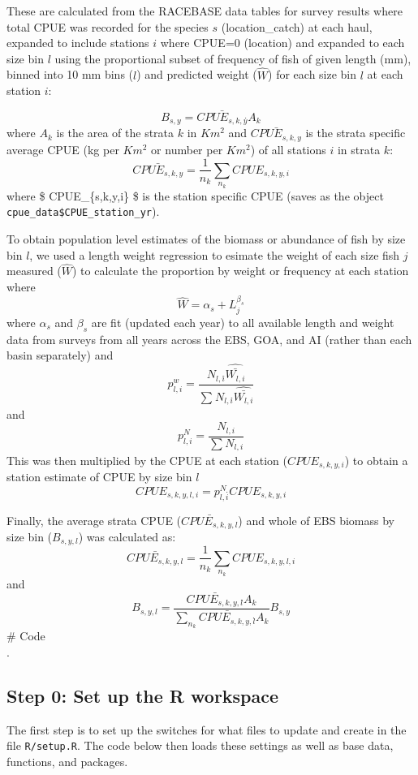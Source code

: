 \documentclass[
]{article}
\begin{document}
These are calculated from the RACEBASE data tables for survey results
where total CPUE was recorded for the species \(s\) (location\_catch) at
each haul, expanded to include stations \(i\) where CPUE=0 (location)
and expanded to each size bin \(l\) using the proportional subset of
frequency of fish of given length (mm), binned into 10 mm bins (\(l\))
and predicted weight (\(\hat{W}\)) for each size bin \(l\) at each
station \(i\):

\[B_{s,y} =  \bar{CPUE_{s,k,y}} \dot{}A_{k}\] where \(A_{k}\) is the
area of the strata \(k\) in \(Km^2\) and \(\bar{CPUE_{s,k,y}}\) is the
strata specific average CPUE (kg per \(Km^2\) or number per \(Km^2\)) of
all stations \(i\) in strata \(k\):
\[\bar{CPUE_{s,k,y}} = \frac{1}{n_k}\dot{}\sum_{n_k}{CPUE_{s,k,y,i}}\]
where \$ CPUE\_\{s,k,y,i\} \$ is the station specific CPUE (saves as the
object \texttt{cpue\_data\$CPUE\_station\_yr}).

To obtain population level estimates of the biomass or abundance of fish
by size bin \(l\), we used a length weight regression to esimate the
weight of each size fish \(j\) measured (\(\hat{W}\)) to calculate the
proportion by weight or frequency at each station where
\[\hat{W} = \alpha_s+L_j^{\beta_s} \] where \(\alpha_s\) and \(\beta_s\)
are fit (updated each year) to all available length and weight data from
surveys from all years across the EBS, GOA, and AI (rather than each
basin separately) and
\[p^w_{l,i} = \frac{N_{l,i}\dot{}\hat{\bar{W_{l,i}}}}{\sum_{}{N_{l,i}\dot{}\hat{\bar{W_{l,i}}}}}\]
and \[p^N_{l,i} = \frac{N_{l,i}}{\sum_{}{N_{l,i}}}\] This was then
multiplied by the CPUE at each station (\(CPUE_{s,k,y,i}\)) to obtain a
station estimate of CPUE by size bin \(l\)
\[CPUE_{s,k,y,l,i} = p^N_{l,i}\dot{}CPUE_{s,k,y,i}\]

Finally, the average strata CPUE (\(\bar{CPUE_{s,k,y,l}}\)) and whole of
EBS biomass by size bin (\(B_{s,y,l}\)) was calculated as:
\[\bar{CPUE_{s,k,y,l}} = \frac{1}{n_k}\dot{}\sum_{n_k}{CPUE_{s,k,y,l,i}}\]
and
\[B_{s,y,l}= \frac{\bar{CPUE_{s,k,y,l}}\dot{}A_{k}}{\sum_{n_k}{\bar{CPUE_{s,k,y,l}}\dot{}A_{k}}}\dot{}B_{s,y}\]
\# Code\\
.

\hypertarget{step-0-set-up-the-r-workspace}{%
\subsection{Step 0: Set up the R
workspace}\label{step-0-set-up-the-r-workspace}}

The first step is to set up the switches for what files to update and
create in the file \texttt{R/setup.R}. The code below then loads these
settings as well as base data, functions, and packages.
\end{document}
